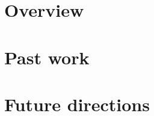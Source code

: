 \documentclass[11pt]{article}
\begin{document}

\section{Overview}

\section{Past work}

\section{Future directions}
\end{document}
